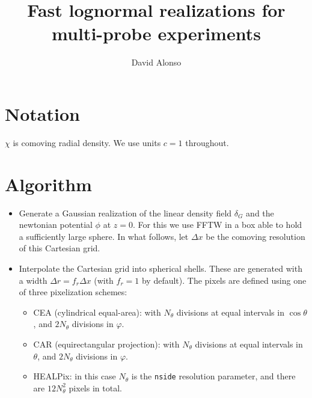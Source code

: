 \documentclass[a4paper,10pt]{article}
\title{Fast lognormal realizations for multi-probe experiments}
\author{David Alonso}
\begin{document}
\maketitle

\section{Notation}
$\chi$ is comoving radial density. We use units $c=1$ throughout.

\section{Algorithm}
  \begin{itemize}
    \item Generate a Gaussian realization of the linear density field
      $\delta_G$ and the newtonian potential $\phi$ at $z=0$. For
      this we use FFTW in a box able to hold a sufficiently large
      sphere. In what follows, let $\Delta x$ be the comoving resolution 
      of this Cartesian grid.
    \item Interpolate the Cartesian grid into spherical shells. These
      are generated with a width $\Delta r=f_r\Delta x$ (with $f_r=1$
      by default). The pixels are defined using one of three pixelization
      schemes:
      \begin{itemize}
        \item CEA (cylindrical equal-area): with $N_\theta$ divisions at
          equal intervals in $\cos\theta$, and $2N_\theta$ divisions in
          $\varphi$.
        \item CAR (equirectangular projection):  with $N_\theta$ divisions at
          equal intervals in $\theta$, and $2N_\theta$ divisions in
          $\varphi$.
        \item HEALPix: in this case $N_\theta$ is the {\tt nside} resolution
          parameter, and there are $12N_\theta^2$ pixels in total.
      \end{itemize}


\end{itemize}
\end{document}
